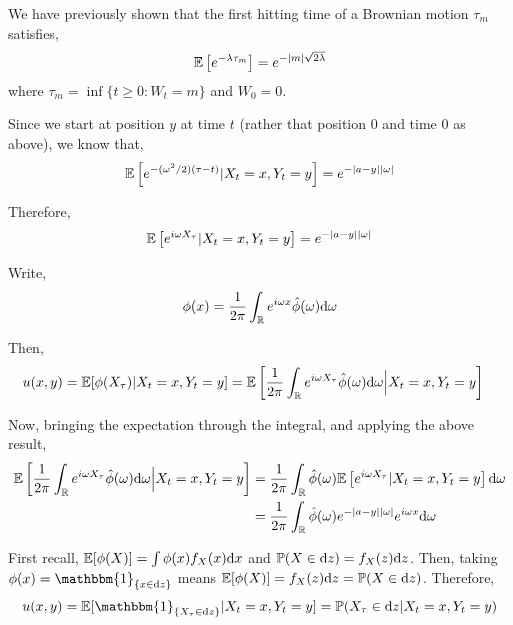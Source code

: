 \begin{solution}[Solution]
\begin{enumerate}
        We have previously shown that the first hitting time of a Brownian motion \( \tau_m \) satisfies,
        \begin{align*}
            \mathbb{E}\left[ e^{-\lambda \tau_m}\right] = e^{-|m|\sqrt{2 \lambda}}
        \end{align*}
        where \( \tau_m = \inf\{t\geq 0 : W_t = m\} \) and \( W_0 = 0 \). 

        Since we start at position \( y \) at time \( t \) (rather that position \( 0 \) and time \( 0 \) as above), we know that,
        \begin{align*}
            \mathbb{E}\left[ e^{-(\omega^2/2)(\tau-t)} | X_t=x, Y_t = y\right] = e^{-|a-y||\omega|} 
        \end{align*}
        
        Therefore,
        \begin{align*}
            \mathbb{E} \left[ e^{i\omega X_\tau} | X_t = x, Y_t = y \right] = e^{-|a-y||\omega|}
        \end{align*}
        
        Write,
        \begin{align*}
            \phi(x) = \dfrac{1}{2\pi} \int_{\mathbb{R}} e^{i\omega x}\hat{\phi}(\omega) \mathrm{d} \omega
        \end{align*}
        
        Then,
        \begin{align*}
            u(x,y) = \mathbb{E}[ \phi(X_\tau) | X_t = x, Y_t = y ] 
            &= \mathbb{E} \left[ \dfrac{1}{2\pi}\int_{\mathbb{R}} e^{i\omega X_\tau} \hat{\phi}(\omega) \mathrm{d} \omega \Big| X_t = x, Y_t = y\right] 
        \end{align*}

        Now, bringing the expectation through the integral, and applying the above result,
        \begin{align*}
            \mathbb{E} \left[ \dfrac{1}{2\pi}\int_{\mathbb{R}} e^{i\omega X_\tau} \hat{\phi}(\omega) \mathrm{d} \omega \Big| X_t = x, Y_t = y\right] 
            &= \dfrac{1}{2\pi} \int_{\mathbb{R}} \hat{\phi}(\omega) \mathbb{E} \left[ e^{i\omega X_\tau} | X_t =x, Y_t =y  \right] \mathrm{d}\omega
            \\&= \dfrac{1}{2\pi} \int_{\mathbb{R}} \hat{\phi}(\omega) e^{-|a-y||\omega|} e^{i\omega x} \mathrm{d}\omega
        \end{align*}
        

        First recall, \( \mathbb{E}[\phi(X)] = \int \phi(x)f_X(x)\mathrm{d} x \) and \( \mathbb{P}(X\in\mathrm{d} z) = f_X(z) \mathrm{d} z \). Then, taking \( \phi(x) =  \mathbbm{1}_{\{ x\in \d z \}} \) means \( \mathbb{E}[\phi(X)] = f_X(z)\mathrm{d} z = \mathbb{P}(X\in\mathrm{d} z) \). Therefore,
        \begin{align*}
            u(x,y) = \EE[\mathbbm{1}_{\{X_\tau\in \d z\}} | X_t = x, Y_t =y] = \PP( X_\tau \in \d z | X_t = x, Y_t = y) 
        \end{align*}
        

\end{enumerate}
\end{solution}
